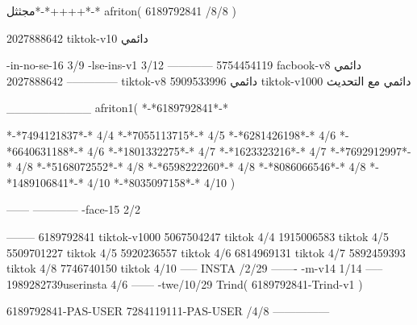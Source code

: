 مجثثل*-*++++*-*
afriton(
6189792841 /8/8
)

2027888642 tiktok-v10
دائمي

-in-no-se-16 3/9
-lse-ins-v1 3/12
------------
5754454119 facbook-v8
دائمي
--------------
2027888642 tiktok-v8
دائمي
5909533996 tiktok-v1000
دائمي مع التحديث

__________
afriton1(
*-*6189792841*-*

*-*7494121837*-* 4/4
*-*7055113715*-* 4/5
*-*6281426198*-* 4/6
*-*6640631188*-* 4/6
*-*1801332275*-* 4/7
*-*1623323216*-* 4/7
*-*7692912997*-* 4/8
*-*5168072552*-* 4/8
*-*6598222260*-* 4/8
*-*8086066546*-* 4/8
*-*1489106841*-* 4/10
*-*8035097158*-* 4/10
)


------
------------
-face-15 2/2

--------
6189792841 tiktok-v1000
5067504247 tiktok 4/4
1915006583 tiktok 4/5
5509701227 tiktok 4/5
5920236557 tiktok 4/6
6814969131 tiktok 4/7
5892459393 tiktok 4/8
7746740150 tiktok 4/10
-----
 INSTA /2/29
-------
-m-v14 1/14
-----
1989282739userinsta 4/6
------
-twe/10/29
Trind(
6189792841-Trind-v1 
)

6189792841-PAS-USER
7284119111-PAS-USER /4/8
    ---------------

